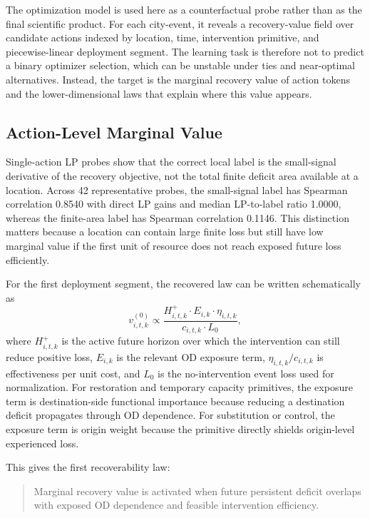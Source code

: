 The optimization model is used here as a counterfactual probe rather than as the final scientific product. For each city-event, it reveals a recovery-value field over candidate actions indexed by location, time, intervention primitive, and piecewise-linear deployment segment. The learning task is therefore not to predict a binary optimizer selection, which can be unstable under ties and near-optimal alternatives. Instead, the target is the marginal recovery value of action tokens and the lower-dimensional laws that explain where this value appears.

\subsection{Action-Level Marginal Value}

Single-action LP probes show that the correct local label is the small-signal derivative of the recovery objective, not the total finite deficit area available at a location. Across 42 representative probes, the small-signal label has Spearman correlation 0.8540 with direct LP gains and median LP-to-label ratio 1.0000, whereas the finite-area label has Spearman correlation 0.1146. This distinction matters because a location can contain large finite loss but still have low marginal value if the first unit of resource does not reach exposed future loss efficiently.

For the first deployment segment, the recovered law can be written schematically as
\begin{equation}
v_{i,t,k}^{(0)}
  \propto
  \frac{
    H_{i,t,k}^{+}
    \cdot E_{i,k}
    \cdot \eta_{i,t,k}
  }{
    c_{i,t,k} \cdot L_0
  },
\end{equation}
where \(H_{i,t,k}^{+}\) is the active future horizon over which the intervention can still reduce positive loss, \(E_{i,k}\) is the relevant OD exposure term, \(\eta_{i,t,k}/c_{i,t,k}\) is effectiveness per unit cost, and \(L_0\) is the no-intervention event loss used for normalization. For restoration and temporary capacity primitives, the exposure term is destination-side functional importance because reducing a destination deficit propagates through OD dependence. For substitution or control, the exposure term is origin weight because the primitive directly shields origin-level experienced loss.

This gives the first recoverability law:
\begin{quote}
Marginal recovery value is activated when future persistent deficit overlaps with exposed OD dependence and feasible intervention efficiency.
\end{quote}

